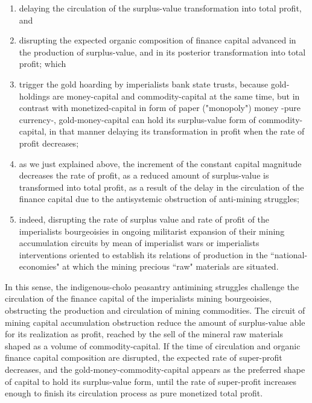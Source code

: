 \documentclass[
]{article}
\begin{document}
\begin{enumerate}
\item
  delaying the circulation of the surplus-value transformation into
  total profit, and
\item
  disrupting the expected organic composition of finance capital
  advanced in the production of surplus-value, and in its posterior
  transformation into total profit; which
\item
  trigger the gold hoarding by imperialists bank state trusts, because
  gold-holdings are money-capital and commodity-capital at the same
  time, but in contrast with monetized-capital in form of paper
  ("monopoly") money -pure currency-, gold-money-capital can hold its
  surplus-value form of commodity-capital, in that manner delaying its
  transformation in profit when the rate of profit decreases;
\item
  as we just explained above, the increment of the constant capital
  magnitude decreases the rate of profit, as a reduced amount of
  surplus-value is transformed into total profit, as a result of the
  delay in the circulation of the finance capital due to the
  antisystemic obstruction of anti-mining struggles;
\item
  indeed, disrupting the rate of surplus value and rate of profit of the
  imperialists bourgeoisies in ongoing militarist expansion of their
  mining accumulation circuits by mean of imperialist wars or
  imperialists interventions oriented to establish its relations of
  production in the ``national-economies" at which the mining precious
  ``raw" materials are situated.
\end{enumerate}

In this sense, the indigenous-cholo peasantry antimining struggles
challenge the circulation of the finance capital of the imperialists
mining bourgeoisies, obstructing the production and circulation of
mining commodities. The circuit of mining capital accumulation
obstruction reduce the amount of surplus-value able for its realization
as profit, reached by the sell of the mineral raw materials shaped as a
volume of commodity-capital. If the time of circulation and organic
finance capital composition are disrupted, the expected rate of
super-profit decreases, and the gold-money-commodity-capital appears as
the preferred shape of capital to hold its surplus-value form, until the
rate of super-profit increases enough to finish its circulation process
as pure monetized total profit.
\end{document}
